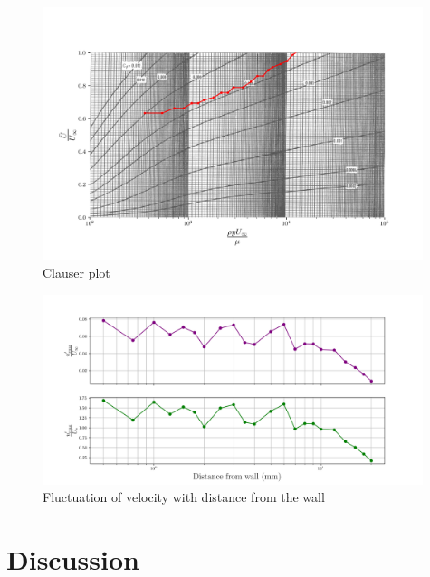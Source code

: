 \documentclass{article}
\begin{document}

\begin{figure}[H]
    \centering
    \includegraphics[width=0.99\textwidth]{clauser_data.png}
    \caption{Clauser plot}
    \label{fig:clauser}
\end{figure}

\begin{figure}[H]
    \centering
    \includegraphics[width=0.99\textwidth]{u_fluctuation.png}
    \caption{Fluctuation of velocity with distance from the wall}
    \label{fig:fluctuation}
\end{figure}


\section{Discussion}
\end{document}
